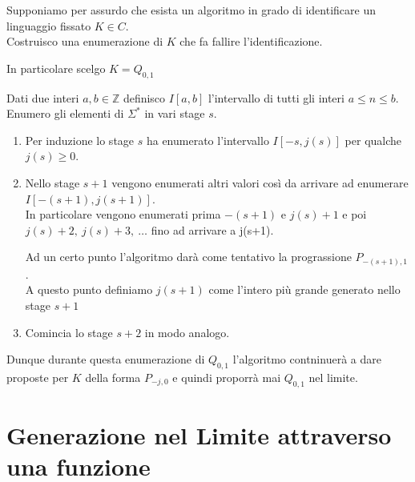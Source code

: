 \documentclass{report}
\newenvironment{pop}{}{}
\begin{document}
\begin{pop}
  Supponiamo per assurdo che esista un algoritmo in grado di identificare un linguaggio fissato $K \in C$. \\ 
  Costruisco una enumerazione di $K$ che fa fallire l'identificazione.
  
  In particolare scelgo $K=Q_{0,1}$

  Dati due interi $a,b \in \mathds{Z} $ definisco $I[a,b]$ l'intervallo di tutti gli interi $a \leq n \leq b$. \\ 
  Enumero gli elementi di $ \Sigma^* $ in vari stage $ s $. \\
  \begin{enumerate}
    \item Per induzione lo stage $s$ ha enumerato l'intervallo $I[-s,j(s)]$ 
      per qualche $j(s)\geq 0$.
    \item Nello stage $s+1$ vengono enumerati altri valori così da arrivare ad enumerare $I[-(s+1),j(s+1)]$. \\ 
      In particolare vengono enumerati prima $-(s+1)$ e $j(s)+1$ e poi $j(s)+2, \ j(s)+3,\ \dots$
      fino ad arrivare a j(s+1).

        Ad un certo punto l'algoritmo darà come tentativo la prograssione $P_{-(s+1),1}$.\\ 
        A questo punto definiamo $j(s+1)$ come l'intero più grande generato nello stage $s+1$
    \item Comincia lo stage $s+2$ in modo analogo.
  \end{enumerate}
  Dunque durante questa enumerazione di $Q_{0,1}$ l'algoritmo contninuerà a dare proposte per $K$ della forma $P_{-j,0}$
  e quindi proporrà mai $Q_{0,1}$ nel limite.
\end{pop}

\chapter{Generazione nel Limite attraverso una funzione}
\begin{pop}
  
\end{pop}


\end{document}
